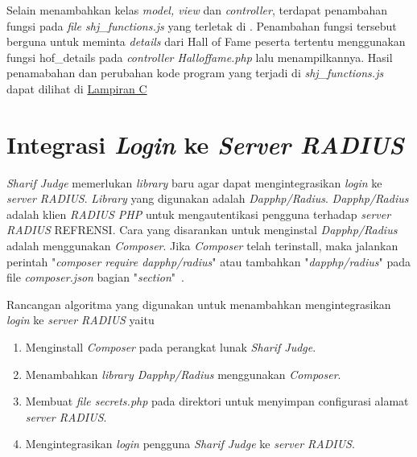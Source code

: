 Selain menambahkan kelas \textit{model, view} dan \textit{controller}, terdapat penambahan fungsi pada \textit{file shj\_functions.js} yang terletak di . Penambahan fungsi tersebut berguna untuk meminta \textit{details} dari Hall of Fame peserta tertentu menggunakan fungsi hof\_details pada \textit{controller Halloffame.php} lalu menampilkannya. Hasil penamabahan dan perubahan kode program yang terjadi di \textit{shj\_functions.js} dapat dilihat di \hyperref[lamp:kodeprogramshjfunc]{Lampiran C}

\section{Integrasi \textit{Login} ke \textit{Server RADIUS}}
\textit{Sharif Judge} memerlukan \textit{library} baru agar dapat mengintegrasikan \textit{login} ke \textit{server RADIUS}. \textit{Library} yang digunakan adalah \textit{Dapphp/Radius}. \textit{Dapphp/Radius} adalah klien \textit{RADIUS PHP} untuk mengautentikasi pengguna terhadap \textit{server RADIUS} REFRENSI. Cara yang disarankan untuk menginstal \textit{Dapphp/Radius} adalah menggunakan \textit{Composer}. Jika \textit{Composer} telah terinstall, maka jalankan perintah "\textit{composer require dapphp/radius}" atau tambahkan "\textit{dapphp/radius}" pada file \textit{composer.json} bagian "\textit{section}"~\cite{drew:16:radius}.

Rancangan algoritma yang digunakan untuk menambahkan mengintegrasikan \textit{login} ke \textit{server RADIUS} yaitu
\begin{enumerate}
	\item Menginstall \textit{Composer} pada perangkat lunak \textit{Sharif Judge}.
	\item Menambahkan \textit{library Dapphp/Radius} menggunakan \textit{Composer}.
	\item Membuat \textit{file secrets.php} pada direktori  untuk menyimpan configurasi alamat \textit{server RADIUS}.
	\item Mengintegrasikan \textit{login} pengguna \textit{Sharif Judge} ke \textit{server RADIUS}.
\end{enumerate}

